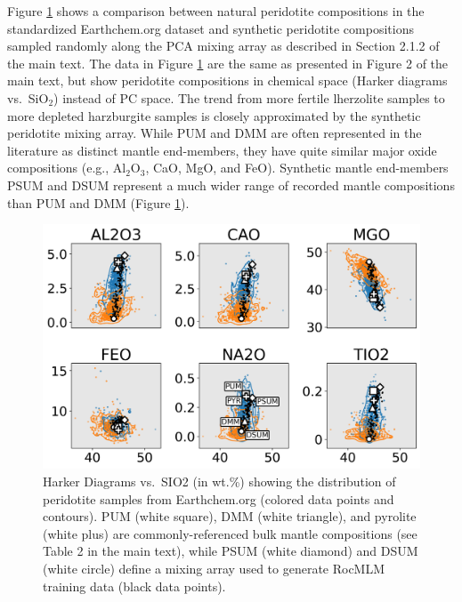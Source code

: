 \documentclass[draft]{agujournal2018}
\begin{document}
Figure \ref{fig:earthchem-harker-diagram} shows a comparison between natural peridotite compositions in the standardized Earthchem.org dataset and synthetic peridotite compositions sampled randomly along the PCA mixing array as described in Section 2.1.2 of the main text. The data in Figure \ref{fig:earthchem-harker-diagram} are the same as presented in Figure 2 of the main text, but show peridotite compositions in chemical space (Harker diagrams vs.~SiO\(_2\)) instead of PC space. The trend from more fertile lherzolite samples to more depleted harzburgite samples is closely approximated by the synthetic peridotite mixing array. While PUM and DMM are often represented in the literature as distinct mantle end-members, they have quite similar major oxide compositions (e.g., Al\(_2\)O\(_3\), CaO, MgO, and FeO). Synthetic mantle end-members PSUM and DSUM represent a much wider range of recorded mantle compositions than PUM and DMM (Figure \ref{fig:earthchem-harker-diagram}).



\begin{figure}[htbp]

{\centering \includegraphics[width=1\linewidth,]{earthchem-harker-diagram} 

}

\caption{Harker Diagrams vs.~SIO2 (in wt.\%) showing the distribution of peridotite samples from Earthchem.org (colored data points and contours). PUM (white square), DMM (white triangle), and pyrolite (white plus) are commonly-referenced bulk mantle compositions (see Table 2 in the main text), while PSUM (white diamond) and DSUM (white circle) define a mixing array used to generate RocMLM training data (black data points).}\label{fig:earthchem-harker-diagram}
\end{figure}
\end{document}
